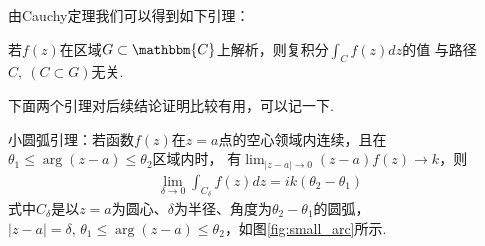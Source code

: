 \documentclass[lang=cn, titlestyle=display, scheme=chinese]{elegantbook}
\begin{document}
                由Cauchy定理我们可以得到如下引理：
                \begin{lemma}
                    若$f(z)$在区域$G\subset\mathbbm{C}$上解析，则复积分$\int_{C}f(z)dz$的值
                    与路径$C,\ (C \subset G)$无关.
                \end{lemma}

                下面两个引理对后续结论证明比较有用，可以记一下.
                \begin{lemma}
                    \label{lem:small_arc_lemma}
                    小圆弧引理：若函数$f(z)$在$z = a$点的空心领域内连续，且在$\theta_1 \leq \arg{(z - a)} \leq \theta_2$区域内时，
                    有$\lim_{|z - a| \to 0}(z - a)f(z) \to k$，则
                    \begin{align*}
                        \lim_{\delta \to 0}\int_{C_\delta}f(z)dz = ik(\theta_2 - \theta_1)
                    \end{align*}
                    式中$C_\delta$是以$z = a$为圆心、$\delta$为半径、角度为$\theta_2 - \theta_1$的圆弧，
                    $|z - a| = \delta,\,\theta_1 \leq \arg{(z - a)} \leq \theta_2$，如图\ref{fig:small_arc}所示.
                \end{lemma}
\end{document}
